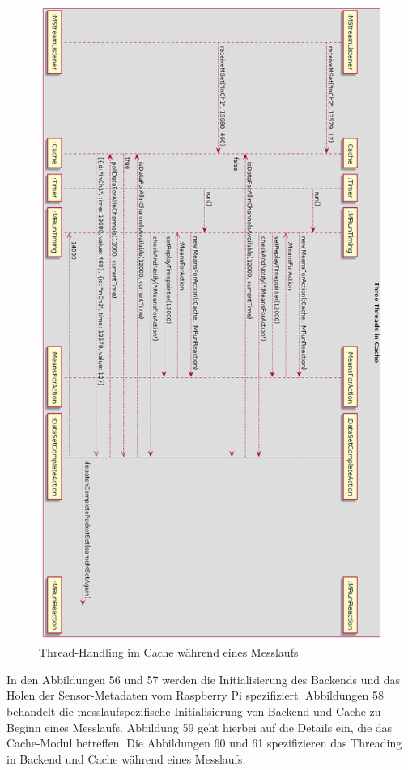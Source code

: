\documentclass[parskip=full]{scrartcl}
\begin{document}
\begin{figure}[htbp]
	\begin{center}
		\includegraphics[width = 12cm]{Grafiken/6-MRunThreadingCache_Rotated.png}
		\caption{Thread-Handling im Cache während eines Messlaufs}
		\label{ThreadingCache}
	\end{center}
\end{figure}

In den Abbildungen 56 und 57 werden die Initialisierung des Backends und das Holen der Sensor-Metadaten vom Raspberry Pi spezifiziert. Abbildungen 58 behandelt die messlaufspezifische Initialisierung von Backend und Cache zu Beginn eines Messlaufs. Abbildung 59 geht hierbei auf die Details ein, die das Cache-Modul betreffen. Die Abbildungen 60 und 61 spezifizieren das Threading in Backend und Cache während eines Messlaufs.
\end{document}

